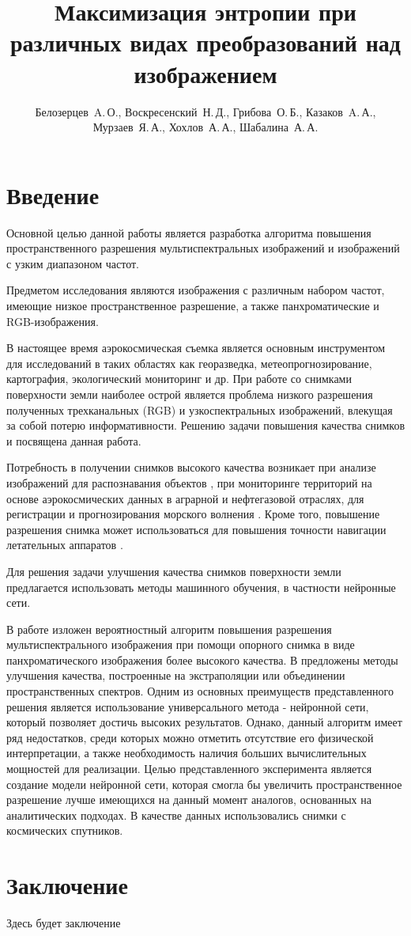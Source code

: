\documentclass[12pt,twoside]{article}
\title
[Максимизация энтропии при различных видах преобразований над изображением] %
{Максимизация энтропии при различных видах преобразований над изображением}
\author
[Автор~И.\,О.] %
{Белозерцев~A.\,О., Воскресенский~Н.\,Д., Грибова~О.\,Б., Казаков~A.\,А., Мурзаев~Я.\,А., Хохлов~А.\,А., Шабалина~А.\,А.} %
[Белозерцев~A.\,О.$^1$, Воскресенский~Н.\,Д.$^1$, Грибова~О.\,Б.$^1$, Казаков~A.\,А.$^1$, Мурзаев~Я.\,А.$^1$, Хохлов~А.\,А.$^1$, Шабалина~А.\,А.$^1$] %
\begin{document}
\maketitle
\section{Введение}
Основной целью данной работы является разработка алгоритма повышения пространственного разрешения мультиспектральных изображений и изображений с узким диапазоном частот. 

Предметом исследования являются изображения с различным набором частот, имеющие низкое пространственное разрешение, а также панхроматические и RGB-изображения.

В настоящее время аэрокосмическая съемка является основным инструментом для исследований в таких областях как георазведка, метеопрогнозирование, картография, экологический мониторинг и др. При работе со снимками поверхности земли наиболее острой является проблема низкого разрешения полученных трехканальных (RGB) и узкоспектральных изображений, влекущая за собой потерю информативности. Решению задачи повышения качества снимков и посвящена данная работа.

Потребность в получении снимков высокого качества возникает при анализе изображений для распознавания объектов \cite{visilter2009rus}, при мониторинге территорий на основе аэрокосмических данных в аграрной \cite{murynin2013} и нефтегазовой \cite{bondur2012aero} отраслях, для регистрации и прогнозирования морского волнения \cite{bondur2016rusvosstanovlenie,bondur2016rusoptimalniy}. Кроме того, повышение разрешения снимка может использоваться для  повышения точности навигации летательных аппаратов \cite{ishutin2016rus,visilter2016ruscomplexirovaniye}.

Для решения задачи улучшения качества снимков поверхности земли предлагается использовать методы машинного обучения, в частности нейронные сети. 

В работе \cite{gorokhovskiy2017rus} изложен вероятностный алгоритм повышения разрешения мультиспектрального изображения при помощи опорного снимка в виде панхроматического изображения более высокого качества. В \cite{gurchenkov2016rus,bochkareva2016rus} предложены методы улучшения качества, построенные на экстраполяции или объединении пространственных спектров.
Одним из основных преимуществ представленного решения является использование универсального метода - нейронной сети, который позволяет достичь высоких результатов. Однако, данный алгоритм имеет ряд недостатков, среди которых можно отметить отсутствие его физической интерпретации, а также необходимость наличия больших вычислительных мощностей для реализации.
Целью представленного эксперимента является создание модели нейронной сети, которая смогла бы увеличить пространственное разрешение лучше имеющихся на данный момент аналогов, основанных на аналитических подходах. В качестве данных использовались снимки с космических спутников.

\section{Заключение}
Здесь будет заключение



\end{document}
